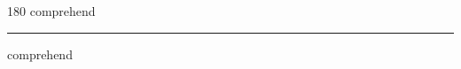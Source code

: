 
\begin{frame}
\begin{center}
\begin{turn}{180}
{\fontsize{2.5cm}{1em}\selectfont comprehend}
\end{turn}
\vspace{1em}\par  
\hrule
\vspace{1em}\par  
{\fontsize{2.5cm}{1em}\selectfont comprehend}
\end{center}
\end{frame}
